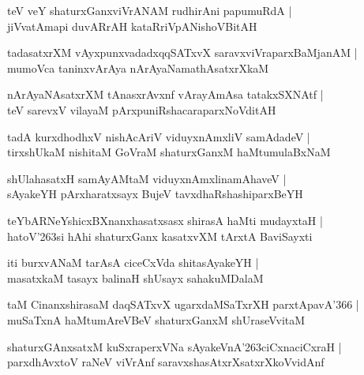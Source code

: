 \documentclass[twoside,12pt,openright]{book}
\def\S{\char'263}
\newcounter{shloka}[chapter]
\begin{document}
\begin{shloka}%
teV veY shaturxGanxviVrANAM rudhirAni papumuRdA |\\
jiVvatAmapi duvARrAH kataRriVpANishoVBitAH 
\end{shloka}

\begin{shloka}%
tadasatxrXM vAyxpunxvadadxqqSATxvX saravxviVraparxBaMjanAM |\\
mumoVca taninxvArAya nArAyaNamathAsatxrXkaM 
\end{shloka}

\begin{shloka}%
nArAyaNAsatxrXM tAnasxrAvxnf vArayAmAsa tatakxSXNAtf |\\
teV sarevxV vilayaM pArxpuniRshacaraparxNoVditAH 
\end{shloka}

\begin{shloka}%
tadA kurxdhodhxV nishAcAriV viduyxnAmxliV samAdadeV |\\
tirxshUkaM nishitaM GoVraM shaturxGanxM haMtumulaBxNaM
\end{shloka}

\begin{shloka}%
shUlahasatxH samAyAMtaM viduyxnAmxlinamAhaveV |\\
sAyakeYH pArxharatxsayx BujeV tavxdhaRshashiparxBeYH
\end{shloka}

\begin{shloka}%
teYbARNeYshicxBXnanxhasatxsasx shirasA haMti mudayxtaH |\\
hatoV\S si hAhi shaturxGanx kasatxvXM tArxtA BaviSayxti 
\end{shloka}

\begin{shloka}%
iti burxvANaM tarAsA ciceCxVda shitasAyakeYH |\\
masatxkaM tasayx balinaH shUsayx sahakuMDalaM 
\end{shloka}

\begin{shloka}%
taM CinanxshirasaM daqSATxvX ugarxdaMSaTxrXH parxtApavA\char'366 |\\
muSaTxnA haMtumAreVBeV shaturxGanxM shUraseVvitaM 
\end{shloka}

\begin{shloka}%
shaturxGAnxsatxM kuSxraperxVNa sAyakeVnA\S ciCxnaciCxraH |\\
parxdhAvxtoV raNeV viVrAnf saravxshasAtxrXsatxrXkoVvidAnf 
\end{shloka}
\end{document}
